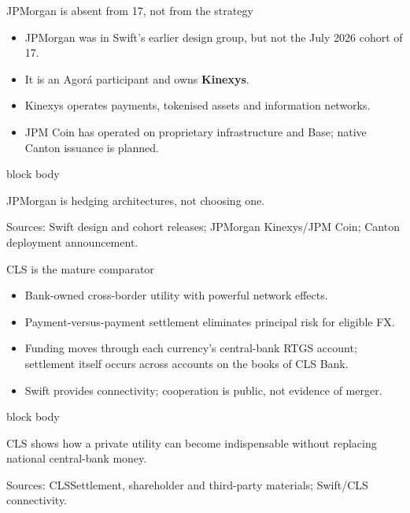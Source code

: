 \documentclass[aspectratio=169,12pt]{beamer}
\newcommand{\rust}[1]{\textcolor{Rust}{\textbf{#1}}}
\newcommand{\source}[1]{\vfill\par\fontsize{5.4}{6.5}\selectfont\color{Quiet}Sources: #1}
\newcommand{\tightitems}{\setlength{\itemsep}{0.42em}\setlength{\parskip}{0pt}}
\newenvironment{statement}{%
  \begin{beamercolorbox}[sep=.18cm,rounded=false,wd=\linewidth]{block body}%
  \fontsize{13}{15.5}\selectfont\bfseries
}{\end{beamercolorbox}}
\begin{document}
\begin{frame}{JPMorgan is absent from 17, not from the strategy}
  \begin{itemize}\tightitems
    \item JPMorgan was in Swift's earlier design group, but not the July 2026 cohort of 17.
    \item It is an Agor\'a participant and owns \rust{Kinexys}.
    \item Kinexys operates payments, tokenised assets and information networks.
    \item JPM Coin has operated on proprietary infrastructure and Base; native Canton issuance is planned.
  \end{itemize}
  \begin{statement}
    JPMorgan is hedging architectures, not choosing one.
  \end{statement}
  \source{Swift design and cohort releases; JPMorgan Kinexys/JPM Coin; Canton deployment announcement.}
\end{frame}

\begin{frame}{CLS is the mature comparator}
  \begin{itemize}\tightitems
    \item Bank-owned cross-border utility with powerful network effects.
    \item Payment-versus-payment settlement eliminates principal risk for eligible FX.
    \item Funding moves through each currency's central-bank RTGS account; settlement itself occurs across accounts on the books of CLS Bank.
    \item Swift provides connectivity; cooperation is public, not evidence of merger.
  \end{itemize}
  \begin{statement}
    CLS shows how a private utility can become indispensable without replacing national central-bank money.
  \end{statement}
  \source{CLSSettlement, shareholder and third-party materials; Swift/CLS connectivity.}
\end{frame}
\end{document}
